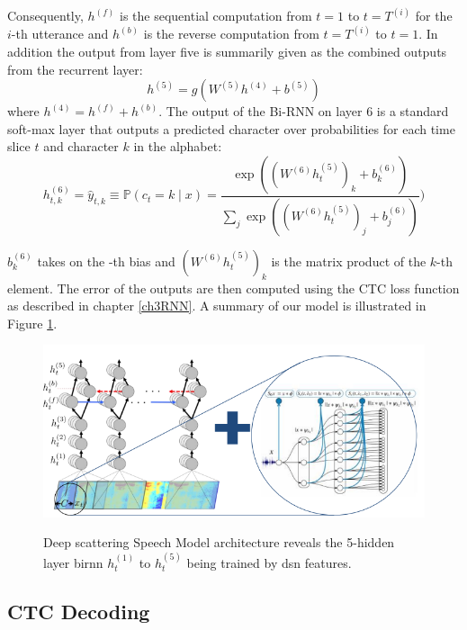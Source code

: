 Consequently, $h^{(f)}$ is the sequential computation from $t=1$ to $t=T^{(i)}$ for the $i$-th utterance and $h^{(b)}$ is the reverse computation from $t=T^{(i)}$ to $t=1$.  In addition the output from layer five is summarily given as the combined outputs from the recurrent layer:
\begin{equation}
h^{(5)} = g(W^{(5)} h^{(4)} + b^{(5)})    \label{ch06_04_l5}
\end{equation}
where $h^{(4)} = h^{(f)} + h^{(b)}$. The output of the Bi-RNN on layer 6 is a standard soft-max layer that outputs a predicted character over probabilities for each time slice $t$ and character $k$ in the alphabet:
\begin{equation}
h^{(6)}_{t,k} = \hat{y}_{t,k} \equiv \mathbb{P}(c_t = k \mid x) = \frac{\exp{ \left( (W^{(6)} h^{(5)}_t)_k + b^{(6)}_k \right)}}{\sum_j \exp{\left( (W^{(6)} h^{(5)}_t)_j + b^{(6)}_j \right)}})    \label{ch06_05_l6}
\end{equation}

$b^{(6)}_k$ takes on the -th bias and $(W^{(6)} h^{(5)}_t)_k$ is the matrix product of the $k$-th element.  The error of the outputs are then computed using the CTC loss function \cite{graves_2014} as described in chapter \ref{ch3RNN}.  A summary of our model is illustrated in Figure \ref{fig_6_1_ctc_scatter}.
\begin{figure}
\centering
  \includegraphics[width=14cm]{thesis/images/ctc_scatter.png}\\
  \caption{Deep scattering Speech Model architecture reveals the 5-hidden layer \acrshort{birnn} $h_t^{(1)}$ to $h_t^{(5)}$ being trained by \acrshort{dsn} features.} \label{fig_6_1_ctc_scatter}
\end{figure}

\subsection{CTC Decoding} \label{sec_c7_ctc_decoder}

